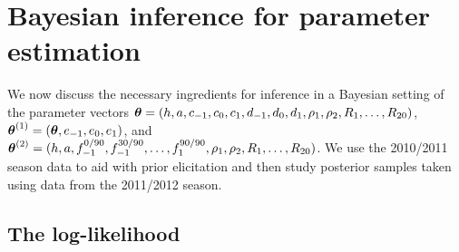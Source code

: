\section{Bayesian inference for parameter estimation} 
\label{sec:Bayesian_inference_for_parameter_estimation}

We now discuss the necessary ingredients for inference in a Bayesian setting of the parameter vectors \(\boldsymbol{\theta} = (h,
a, c_{-1}, c_{0}, c_{1}, d_{-1}, d_{0}, d_{1}, \rho_1, \rho_2, R_1, \ldots, R_{20})\), \(\boldsymbol{\theta}^{(1)} = (\boldsymbol{\theta},
e_{-1}, e_{0}, e_{1})\), and \(\boldsymbol{\theta}^{(2)} = (h, a, f_{-1}^{0/90}, f_{-1}^{30/90}, \ldots, f_{1}^{90/90}, \rho_1,
\rho_2, R_1, \ldots, R_{20})\). We use the 2010/2011 season data to aid with prior elicitation and then study posterior
samples taken using data from the 2011/2012 season.

\subsection{The log-likelihood} 
\label{sec:The_log-likelihood}

